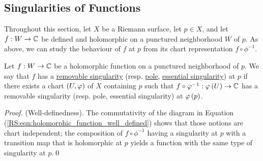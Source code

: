 \documentclass[../Moduli_Spaces_of_Riemann_Surfaces.tex]{subfiles}
\begin{document}
    \subsection{Singularities of Functions}
    Throughout this section, let $X$ be a Riemann surface, let $p\in X$, and let $f:W\to\mathbb{C}$ be defined and holomorphic on a punctured neighborhood $W$ of $p$. As above, we can study the behaviour of $f$ at $p$ from its chart representation $f\circ\phi^{-1}$.
    \begin{definition}
        Let $f:W\to\mathbb{C}$ be a holomorphic function on a punctured neighborhood of $p$. We say that $f$ has a \ul{removable singularity} (resp. \ul{pole}, \ul{essential singularity}) at $p$ if there exists a chart $\left(U,\varphi\right)$ of $X$ containing $p$ such that $f\circ\varphi^{-1}:\varphi\left(U\right)\to\mathbb{C}$ has a removable singularity (resp. pole, essential singularity) at $\varphi\left(p\right)$.
    \end{definition}
    \begin{proof}
        (Well-definedness). The commutativity of the diagram in Equation (\ref{RS:eqn:holomorphic_function_well_defined}) shows that those notions are chart independent; the composition of $f\circ\phi^{-1}$ having a singularity at $p$ with a transition map that is holomorphic at $p$ yields a function with the same type of singularity at $p$.\qed
    \end{proof}
\end{document}
